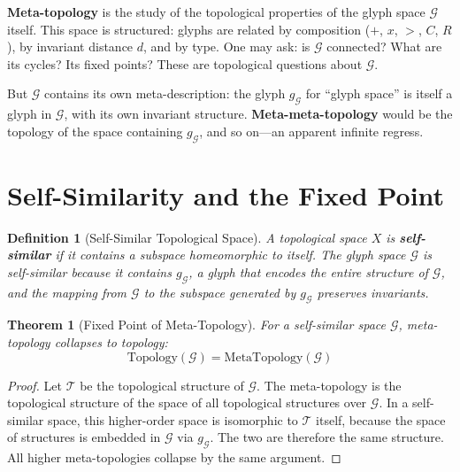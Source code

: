 \documentclass[12pt, letterpaper]{book}
\def\equiv{=}%
\def\otimes{x}%
\def\oplus{+}%
\def\triangleright{>}%
\def\subset{C}%
\def\circlearrowleft{R}%
\def\mathfrak#1{#1}%
\newtheorem{theorem}{Theorem}[chapter]
\newtheorem{definition}{Definition}[chapter]
\begin{document}
\textbf{Meta-topology} is the study of the topological properties of the glyph space $\mathcal{G}$ itself. This space is structured: glyphs are related by composition ($\oplus$, $\otimes$, $\triangleright$, $\subset$, $\circlearrowleft$), by invariant distance $d$, and by type. One may ask: is $\mathcal{G}$ connected? What are its cycles? Its fixed points? These are topological questions about $\mathcal{G}$.

But $\mathcal{G}$ contains its own meta-description: the glyph $\mathfrak{g}_\mathcal{G}$ for ``glyph space'' is itself a glyph in $\mathcal{G}$, with its own invariant structure. \textbf{Meta-meta-topology} would be the topology of the space containing $\mathfrak{g}_\mathcal{G}$, and so on---an apparent infinite regress.

\section{Self-Similarity and the Fixed Point}

\begin{definition}[Self-Similar Topological Space]\label{def:self-similar}
A topological space $X$ is \textbf{self-similar} if it contains a subspace homeomorphic to itself. The glyph space $\mathcal{G}$ is self-similar because it contains $\mathfrak{g}_\mathcal{G}$, a glyph that encodes the entire structure of $\mathcal{G}$, and the mapping from $\mathcal{G}$ to the subspace generated by $\mathfrak{g}_\mathcal{G}$ preserves invariants.
\end{definition}

\begin{theorem}[Fixed Point of Meta-Topology]\label{thm:meta-topo-fp}
For a self-similar space $\mathcal{G}$, meta-topology collapses to topology:
\[
\mathrm{Topology}(\mathcal{G}) \equiv \mathrm{MetaTopology}(\mathcal{G})
\]
\end{theorem}

\begin{proof}
Let $\mathcal{T}$ be the topological structure of $\mathcal{G}$. The meta-topology is the topological structure of the space of all topological structures over $\mathcal{G}$. In a self-similar space, this higher-order space is isomorphic to $\mathcal{T}$ itself, because the space of structures is embedded in $\mathcal{G}$ via $\mathfrak{g}_\mathcal{G}$. The two are therefore the same structure. All higher meta-topologies collapse by the same argument.
\end{proof}
\end{document}

